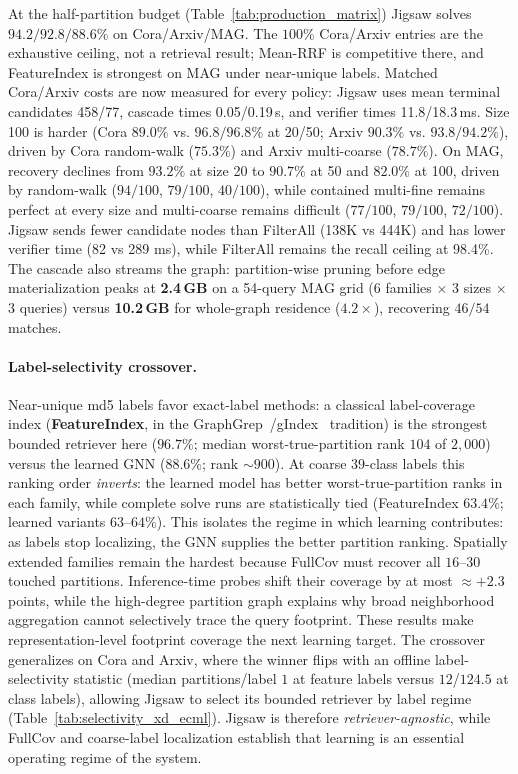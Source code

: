 \documentclass[runningheads]{llncs}
\begin{document}
At the half-partition budget (Table~\ref{tab:production_matrix}) Jigsaw solves $94.2/92.8/88.6\%$ on Cora/Arxiv/MAG. The $100\%$ Cora/Arxiv entries are the exhaustive ceiling, not a retrieval result; Mean-RRF is competitive there, and FeatureIndex is strongest on MAG under near-unique labels. Matched Cora/Arxiv costs are now measured for every policy: Jigsaw uses mean terminal candidates 458/77, cascade times 0.05/0.19\,s, and verifier times 11.8/18.3\,ms. Size 100 is harder (Cora $89.0\%$ vs. $96.8/96.8\%$ at 20/50; Arxiv $90.3\%$ vs. $93.8/94.2\%$), driven by Cora random-walk ($75.3\%$) and Arxiv multi-coarse ($78.7\%$). On MAG, recovery declines from $93.2\%$ at size 20 to $90.7\%$ at 50 and $82.0\%$ at 100, driven by random-walk ($94/100$, $79/100$, $40/100$), while contained multi-fine remains perfect at every size and multi-coarse remains difficult ($77/100$, $79/100$, $72/100$). Jigsaw sends fewer candidate nodes than FilterAll (138K vs 444K) and has lower verifier time (82 vs 289 ms), while FilterAll remains the recall ceiling at 98.4\%. The cascade also streams the graph: partition-wise pruning before edge materialization peaks at \textbf{2.4\,GB} on a 54-query MAG grid (6 families $\times$ 3 sizes $\times$ 3 queries) versus \textbf{10.2\,GB} for whole-graph residence ($4.2\times$), recovering $46/54$ matches.

\paragraph{Label-selectivity crossover.} Near-unique md5 labels favor exact-label methods: a classical label-coverage index (\textbf{FeatureIndex}, in the GraphGrep~\cite{ref_graphgrep}/gIndex~\cite{ref_gindex} tradition) is the strongest bounded retriever here ($96.7\%$; median worst-true-partition rank $104$ of $2{,}000$) versus the learned GNN ($88.6\%$; rank ${\sim}900$). At coarse $39$-class labels this ranking order \emph{inverts}: the learned model has better worst-true-partition ranks in each family, while complete solve runs are statistically tied (FeatureIndex $63.4\%$; learned variants $63$--$64\%$). This isolates the regime in which learning contributes: as labels stop localizing, the GNN supplies the better partition ranking. Spatially extended families remain the hardest because FullCov must recover all $16$--$30$ touched partitions. Inference-time probes shift their coverage by at most ${\approx}{+}2.3$ points, while the high-degree partition graph explains why broad neighborhood aggregation cannot selectively trace the query footprint. These results make representation-level footprint coverage the next learning target. The crossover generalizes on Cora and Arxiv, where the winner flips with an offline label-selectivity statistic (median partitions/label $1$ at feature labels versus $12$/$124.5$ at class labels), allowing Jigsaw to select its bounded retriever by label regime (Table~\ref{tab:selectivity_xd_ecml}). Jigsaw is therefore \emph{retriever-agnostic}, while FullCov and coarse-label localization establish that learning is an essential operating regime of the system.
\end{document}

